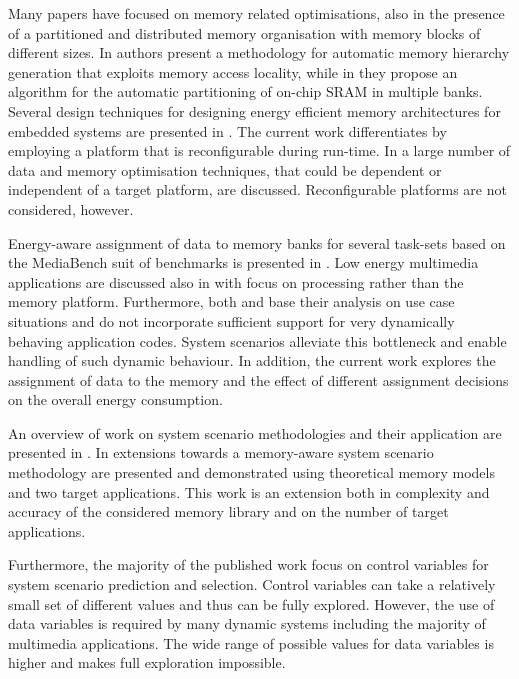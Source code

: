 \documentclass[a4paper,conference]{IEEEtran}
\begin{document}
Many papers have focused on memory related optimisations, also in the presence of a partitioned and distributed memory organisation with memory blocks of different sizes. In \cite{Ben00b} authors present a methodology for automatic memory hierarchy generation that exploits memory access locality, while in \cite{Ben00c} they propose an algorithm for the automatic partitioning of on-chip SRAM in multiple banks. Several design techniques for designing energy efficient memory architectures for embedded systems are presented in \cite{Mac02}. The current work differentiates by employing a platform that is reconfigurable during run-time. In \cite{Pgk01} a large number of data and memory optimisation techniques, that could be dependent or independent of a target platform, are discussed. Reconfigurable platforms are not considered, however.

Energy-aware assignment of data to memory banks for several task-sets based on the MediaBench suit of benchmarks is presented in \cite{Mar03}. Low energy multimedia applications are discussed also in \cite{Chu02} with focus on processing rather than the memory platform. Furthermore, both \cite{Mar03} and \cite{Chu02} base their analysis on use case situations and do not incorporate sufficient support for very dynamically behaving application codes. System scenarios alleviate this bottleneck and enable handling of such dynamic behaviour. In addition, the current work explores the assignment of data to the memory and the effect of different assignment decisions on the overall energy consumption.

An overview of work on system scenario methodologies and their application are presented in \cite{Gheorghita2007}. In \cite{Fil12} extensions towards a memory-aware system scenario methodology are presented and demonstrated using theoretical memory models and two target applications. This work is an extension both in complexity and accuracy of the considered memory library and on the number of target applications. 

Furthermore, the majority of the published work focus on control variables for system scenario prediction and selection. Control variables can take a relatively small set of different values and thus can be fully explored. However, the use of data variables \cite{Elena2010} is required by many dynamic systems including the majority of multimedia applications. The wide range of possible values for data variables is higher and makes full exploration impossible. 
\end{document}
